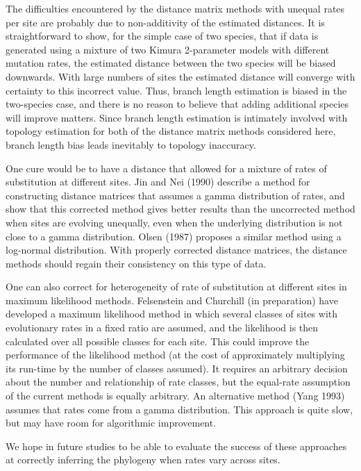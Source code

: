    The difficulties encountered by the distance matrix methods with
unequal rates per site are probably due to non-additivity of the
estimated distances.  It is straightforward to show, for the simple case
of two species, that if data is generated using a mixture of two
Kimura 2-parameter models with different mutation rates, the estimated
distance between the two species will be biased downwards.  With large
numbers of sites the estimated distance will converge with certainty to
this incorrect value.  Thus, branch length estimation is biased in
the two-species case, and there is no reason to believe that adding
additional species will improve matters.  Since branch length estimation
is intimately involved with topology estimation for both of the distance
matrix methods considered here, branch length bias leads
inevitably to topology inaccuracy.

One cure would be to have a distance that allowed for a mixture of
rates of substitution at different sites.  Jin and Nei (1990) describe a method
for constructing distance matrices that assumes a gamma distribution 
of rates, and show that this corrected method gives better results 
than the uncorrected method when sites are evolving unequally, even 
when the underlying distribution is not close to a gamma 
distribution.  Olsen (1987) proposes a similar method using a log-normal 
distribution.  With properly corrected distance matrices, the 
distance methods should regain their consistency on this type of 
data.

One can also correct for heterogeneity of rate of substitution at different
sites in maximum likelihood methods.  Felsenstein and Churchill (in
preparation) have developed a 
maximum likelihood method in which several classes of sites with 
evolutionary rates in a fixed ratio are assumed, and the likelihood is 
then calculated over all possible classes for each site.  This could 
improve the performance of the likelihood method (at the cost of 
approximately multiplying its run-time by the number of classes 
assumed).  It requires an arbitrary decision about the number and 
relationship of rate classes, but the equal-rate assumption of the current
methods is equally arbitrary.  An alternative method (Yang 1993)
assumes that rates come from a gamma distribution.  This approach is
quite slow, but may have room for algorithmic improvement.

	We hope in future studies to be able to evaluate the success of 
these approaches at correctly inferring the phylogeny when rates 
vary across sites.

